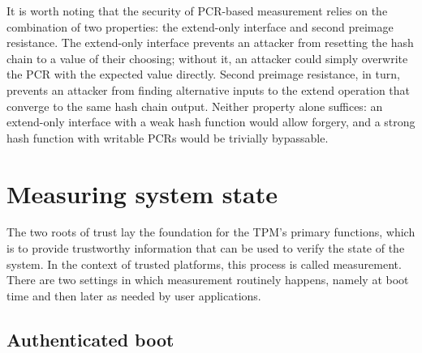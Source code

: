 \documentclass[11pt]{article}
\begin{document}
It is worth noting that the security of PCR-based measurement relies on the combination of two properties: the extend-only interface and second preimage resistance. The extend-only interface prevents an attacker from resetting the hash chain to a value of their choosing; without it, an attacker could simply overwrite the PCR with the expected value directly. Second preimage resistance, in turn, prevents an attacker from finding alternative inputs to the extend operation that converge to the same hash chain output. Neither property alone suffices: an extend-only interface with a weak hash function would allow forgery, and a strong hash function with writable PCRs would be trivially bypassable.

\section{Measuring system state}

The two roots of trust lay the foundation for the TPM's primary functions, which is to provide trustworthy information that can be used to verify the state of the system. In the context of trusted platforms, this process is called measurement. There are two settings in which measurement routinely happens, namely at boot time and then later as needed by user applications.

\subsection{Authenticated boot}
\end{document}
